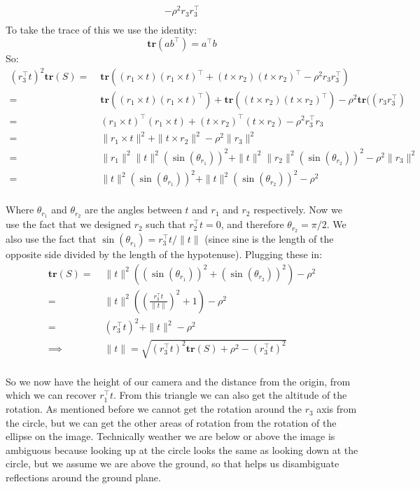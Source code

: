 \documentclass[11pt,english]{article}
\begin{document}
\begin{enumerate}
\begin{align*}
		- \rho^2 r_3 r_3^\top \\
\end{align*}
To take the trace of this we use the identity:
\[ \mathbf{tr}(ab^\top) = a^\top b \]
So:
\begin{align*}
(r_3^\top t)^2 \mathbf{tr}(S) 
=&\; \mathbf{tr}((r_1 \times t)(r_1 \times t)^\top + (t \times r_2)(t \times r_2)^\top
		- \rho^2 r_3 r_3^\top) \\
=&\; \mathbf{tr}((r_1 \times t)(r_1 \times t)^\top) + \mathbf{tr}((t \times r_2)(t \times r_2)^\top)
		- \rho^2 \mathbf{tr}((r_3 r_3^\top) \\
=&\; (r_1 \times t)^\top (r_1 \times t) + (t \times r_2)^\top (t \times r_2) - \rho^2 r_3^\top r_3 \\
=&\; \|r_1 \times t\|^2 + \| t \times r_2 \|^2 - \rho^2 \| r_3 \|^2 \\
=&\; \|r_1\|^2 \|t\|^2 (\sin(\theta_{r_1}))^2 + \|t\|^2 \|r_2\|^2 (\sin(\theta_{r_2}))^2 - \rho^2 \| r_3 \|^2 \\
=&\; \|t\|^2 (\sin(\theta_{r_1}))^2 + \|t\|^2 (\sin(\theta_{r_2}))^2 - \rho^2 \\
\end{align*}

Where $\theta_{r_1}$ and $\theta_{r_2}$ are the angles between $t$ and $r_1$ and $r_2$ respectively.
Now we use the fact that we designed $r_2$ such that $r_2^\top t = 0$, and therefore $\theta_{r_2} = \pi/2$.
We also use the fact that $\sin(\theta_{r_1}) = r_3^\top t / \|t\|$ (since sine is the length of the opposite side
divided by the length of the hypotenuse). Plugging these in:
\begin{align*}
\mathbf{tr}(S) 
=&\; \|t\|^2 ((\sin(\theta_{r_1}))^2 + (\sin(\theta_{r_2}))^2) - \rho^2 \\
=&\; \|t\|^2 \left(\left(\frac{r_3^\top t}{\|t\|}\right)^2 + 1\right) - \rho^2 \\
=&\; (r_3^\top t)^2 + \|t\|^2 - \rho^2 \\
\implies &\; \|t\| = \sqrt{(r_3^\top t)^2\mathbf{tr}(S) + \rho^2 - (r_3^\top t)^2} \\
\end{align*}

So we now have the height of our camera and the distance from the origin, from which we can recover
$r_1^\top t$. From this triangle we can also get the altitude of the rotation. As mentioned before we
cannot get the rotation around the $r_3$ axis from the circle, but we can get the other areas of rotation
from the rotation of the ellipse on the image. Technically weather we are below or above the image is ambiguous
because looking up at the circle looks the same as looking down at the circle, but we assume we are above the
ground, so that helps us disambiguate reflections around the ground plane.


\end{enumerate}
\end{document}
